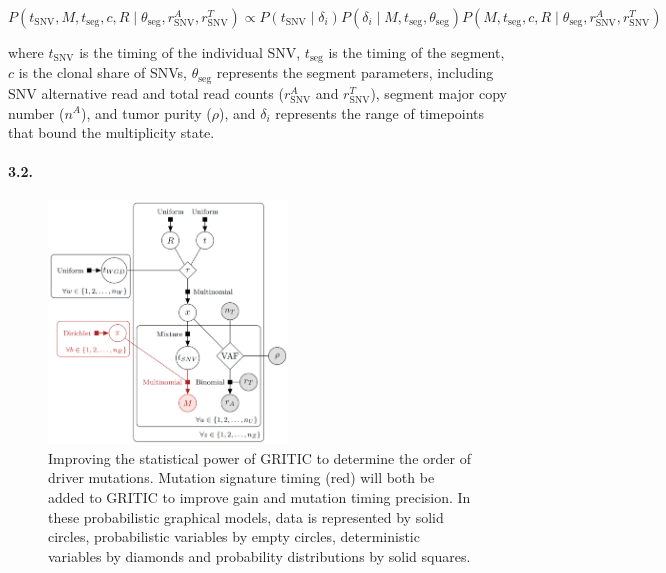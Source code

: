 \[
P(t_{\text{SNV}}, M, t_{\text{seg}}, c, R \mid \theta_{\text{seg}}, r_{\text{SNV}}^A, r_{\text{SNV}}^T) \propto P(t_{\text{SNV}} \mid \delta_i) P(\delta_i \mid M, t_{\text{seg}}, \theta_{\text{seg}}) P(M, t_{\text{seg}}, c, R \mid \theta_{\text{seg}}, r_{\text{SNV}}^A, r_{\text{SNV}}^T)
\]

\noindent
where \( t_{\text{SNV}} \) is the timing of the individual SNV,
\( t_{\text{seg}} \) is the timing of the segment,
\( c \) is the clonal share of SNVs,
\( \theta_{\text{seg}} \) represents the segment parameters, 
including SNV alternative read and total read counts (\( r_{\text{SNV}}^A \) and \( r_{\text{SNV}}^T \)), 
segment major copy number (\( n^A \)), and tumor purity (\( \rho \)), and 
\( \delta_i \) represents the range of timepoints that bound the multiplicity state.

\paragraph{3.2. \SpecificAimThreeB}

\begin{figure} %
  \centering
  \begin{mdframed}
  \includegraphics[width=2.5in]{./Figures/GRITIC_improvements.png}
  \caption{Improving the statistical power of GRITIC to determine the order of driver mutations. 
  Mutation signature timing (red) will both be added to GRITIC to improve gain and mutation timing precision. 
  In these probabilistic graphical models, data is represented by solid circles, probabilistic variables by empty circles, 
  deterministic variables by diamonds and probability distributions by solid squares.
}
  \label{GRITIC_improvements}
  \end{mdframed}
\end{figure}

